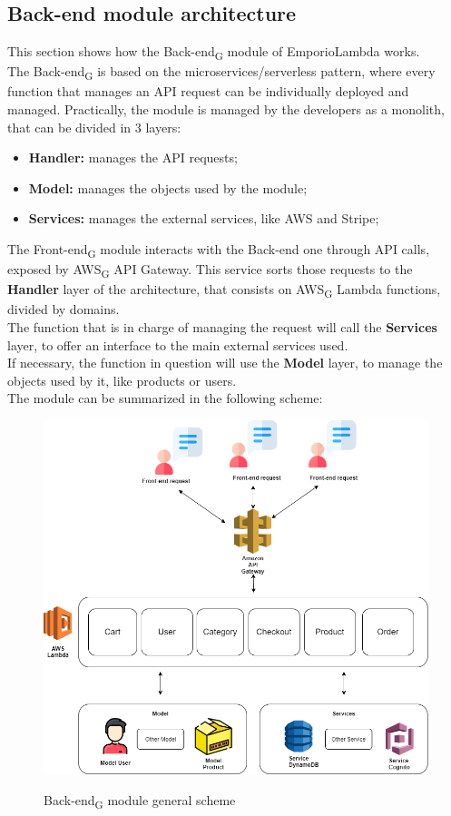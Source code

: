 \subsection{Back-end module architecture}
This section shows how the Back-end\textsubscript{G} module of EmporioLambda works. \\The Back-end\textsubscript{G} is based on the microservices/serverless pattern, where every function that manages an API request can be individually deployed and managed. Practically, the module is managed by the developers as a monolith, that can be divided in 3 layers:
\begin{itemize}
\item \textbf{Handler:} manages the API requests;
\item \textbf{Model:} manages the objects used by the module;
\item \textbf{Services:} manages the external services, like AWS and Stripe;
\end{itemize} 

The Front-end\textsubscript{G} module interacts with the Back-end one through API calls, exposed by AWS\textsubscript{G} API Gateway. This service sorts those requests to the \textbf{Handler} layer of the architecture, that consists on AWS\textsubscript{G} Lambda functions, divided by domains.\\
The function that is in charge of managing the request will call the \textbf{Services} layer, to offer an interface to the main external services used.\\
If necessary, the function in question will use the \textbf{Model} layer, to manage the objects used by it, like products or users.\\

The module can be summarized in the following scheme: 

\begin{figure}[H]
\centering
\includegraphics[scale=0.45]{res/Architettura/Backend/img/layerBack-end}\\
\caption{Back-end\textsubscript{G} module general scheme}
\end{figure}

